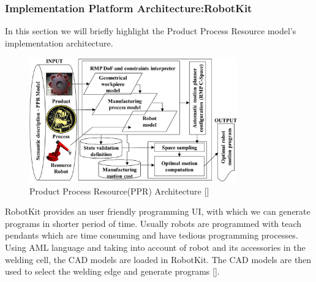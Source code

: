 \subsubsection{Implementation Platform Architecture:RobotKit}
In this section we will briefly highlight the Product Process Resource model's implementation architecture.
\begin{figure}[htbp] %
 \centering
   \includegraphics[width=9cm]{images/ppr_2.png}
   \caption[Product Process Resource(PPR) Architecture]
   { Product Process Resource(PPR) Architecture [\citet{DiazP2016}]}  
\label{fig:img8}
\end{figure}

RobotKit provides an user friendly programming UI, with which we can generate programs in shorter period of time. Usually robots are programmed with teach pendants which are time consuming and have tedious programming processes. Using AML language and taking into account of robot and its accessories in the welding cell, the CAD models are loaded in RobotKit. 
The CAD models are then used to select the welding edge and generate programs [\citet{pminternshipreport}].
\clearpage